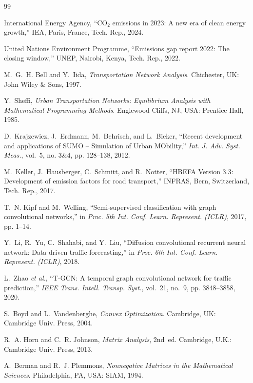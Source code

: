 \documentclass[journal]{IEEEtran}
\begin{document}
\begin{thebibliography}{99}

International Energy Agency, ``$\text{CO}_2$ emissions in 2023: A new era of clean energy growth,'' IEA, Paris, France, Tech. Rep., 2024.

United Nations Environment Programme, ``Emissions gap report 2022: The closing window,'' UNEP, Nairobi, Kenya, Tech. Rep., 2022.

M.~G.~H. Bell and Y.~Iida, \emph{Transportation Network Analysis}. Chichester, UK: John Wiley \& Sons, 1997.

Y.~Sheffi, \emph{Urban Transportation Networks: Equilibrium Analysis with Mathematical Programming Methods}. Englewood Cliffs, NJ, USA: Prentice-Hall, 1985.

D.~Krajzewicz, J.~Erdmann, M.~Behrisch, and L.~Bieker, ``Recent development and applications of {SUMO} -- {Simulation of Urban MObility},'' \emph{Int. J. Adv. Syst. Meas.}, vol.~5, no. 3\&4, pp. 128--138, 2012.

M.~Keller, J.~Hausberger, C.~Schmitt, and R.~Notter, ``{HBEFA} Version 3.3: Development of emission factors for road transport,'' INFRAS, Bern, Switzerland, Tech. Rep., 2017.

T.~N. Kipf and M.~Welling, ``Semi-supervised classification with graph convolutional networks,'' in \emph{Proc. 5th Int. Conf. Learn. Represent. (ICLR)}, 2017, pp. 1--14.

Y.~Li, R.~Yu, C.~Shahabi, and Y.~Liu, ``Diffusion convolutional recurrent neural network: Data-driven traffic forecasting,'' in \emph{Proc. 6th Int. Conf. Learn. Represent. (ICLR)}, 2018.

L.~Zhao \emph{et al.}, ``{T-GCN}: A temporal graph convolutional network for traffic prediction,'' \emph{IEEE Trans. Intell. Transp. Syst.}, vol.~21, no.~9, pp. 3848--3858, 2020.

S.~Boyd and L.~Vandenberghe, \emph{Convex Optimization}. Cambridge, UK: Cambridge Univ. Press, 2004.

R.~A. Horn and C.~R. Johnson, \emph{Matrix Analysis}, 2nd~ed. Cambridge, U.K.: Cambridge Univ. Press, 2013.

A.~Berman and R.~J. Plemmons, \emph{Nonnegative Matrices in the Mathematical Sciences}. Philadelphia, PA, USA: SIAM, 1994.


\end{thebibliography}
\end{document}
